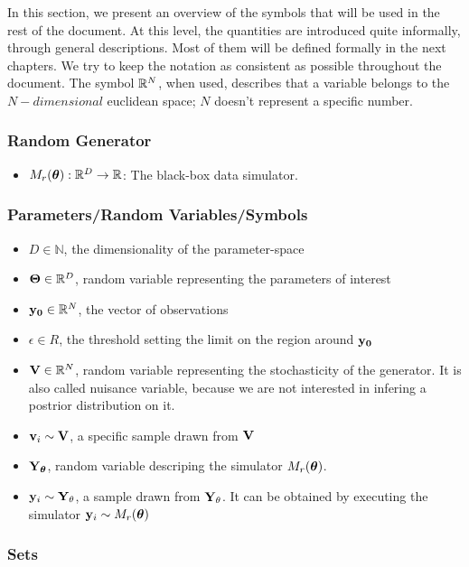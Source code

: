 In this section, we present an overview of the symbols that will be
used in the rest of the document. At this level, the quantities are
introduced quite informally, through general descriptions. Most of
them will be defined formally in the next chapters. We try to keep the
notation as consistent as possible throughout the document. The symbol
$\mathbb{R}^N$, when used, describes that a variable belongs to the 
$N-dimensional$ euclidean space; $N$ doesn't represent a specific
number.

\subsubsection*{Random Generator}
\label{sec:random-generator}
\begin{itemize}
\item $M_r(\boldsymbol{\theta}): \mathbb{R}^D \rightarrow \mathbb{R}$: The black-box data simulator.
\end{itemize}

\subsubsection*{Parameters/Random Variables/Symbols}
\label{sec:variables}

\begin{itemize}
\item $D \in \mathbb{N}$, the dimensionality of the parameter-space
\item $\mathbf{\Theta} \in \mathbb{R}^D$, random variable representing the parameters of interest
\item $\mathbf{y_0} \in \mathbb{R}^N$, the vector of observations
\item $\epsilon \in R$, the threshold setting the limit on the region around $\mathbf{y_0}$
\item $\mathbf{V} \in \mathbb{R}^N$, random variable representing the stochasticity of
  the generator. It is also called nuisance variable, because we are not interested in infering a postrior distribution on it.
\item $\mathbf{v}_i \sim \mathbf{V}$, a specific sample drawn from $\mathbf{V}$
\item $\mathbf{Y}_{\boldsymbol{\theta}}$, random variable descriping the simulator $M_r(\boldsymbol{\theta})$. 
\item $\mathbf{y}_i \sim \mathbf{Y}_\theta$, a sample drawn from $\mathbf{Y}_\theta$. It can
  be obtained by executing the simulator $\mathbf{y}_i \sim M_r(\boldsymbol{\theta})$
\end{itemize}


\subsubsection*{Sets}
\label{sec:sets}

